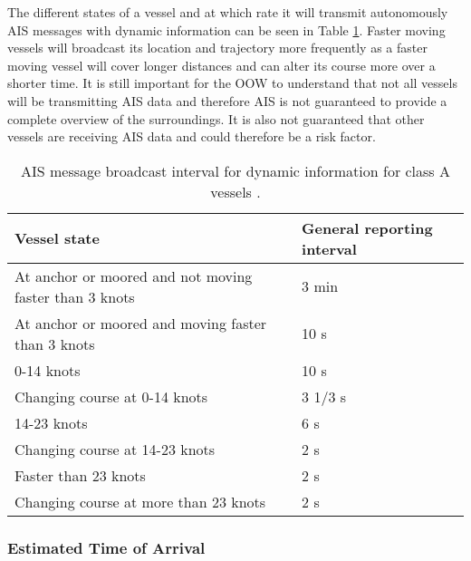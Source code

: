 \documentclass[../main.tex]{subfiles}
\begin{document}
The different states of a vessel and at which rate it will transmit autonomously AIS messages with dynamic information can be seen in Table \ref{tab:ais-rates}. Faster moving vessels will broadcast its location and trajectory more frequently as a faster moving vessel will cover longer distances and can alter its course more over a shorter time. It is still important for the OOW to understand that not all vessels will be transmitting AIS data and therefore AIS is not guaranteed to provide a complete overview of the surroundings. It is also not guaranteed that other vessels are receiving AIS data and could therefore be a risk factor. 

\begin{table}[H]
\centering
\begin{tabular}{|m{7cm}|m{4cm}|}
\hline
\rowcolor[HTML]{C0C0C0} 
\textbf{Vessel state}                                  & \textbf{General reporting interval} \\ \hline
At anchor or moored and not moving faster than 3 knots & 3 min                               \\ \hline
At anchor or moored and moving faster than 3 knots     & 10 s                                \\ \hline
0-14 knots                                             & 10 s                                \\ \hline
Changing course at 0-14 knots                          & 3 1/3 s                             \\ \hline
14-23 knots                                            & 6 s                                 \\ \hline
Changing course at 14-23 knots                         & 2 s                                 \\ \hline
Faster than 23 knots                                   & 2 s                                 \\ \hline
Changing course at more than 23 knots                  & 2 s                                 \\ \hline
\end{tabular}
\caption{AIS message broadcast interval for dynamic information for class A vessels \cite{IMO_2015}.}
\label{tab:ais-rates}
\end{table}


\subsubsection{Estimated Time of Arrival}
\end{document}
